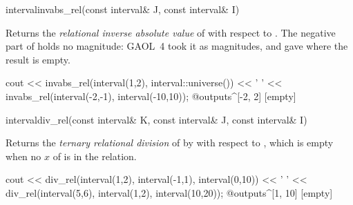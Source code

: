 \documentclass[12pt,a4paper,twoside,openright]{book}
\begin{document}
\begin{deffun}{interval}{invabs\_rel}{(const interval\& J, const interval\& I)}
  \begin{operation}
  \end{operation}
  Returns the \emph{relational inverse absolute value} of  with
  respect to . The negative part of  holds no magnitude:
  GAOL~4 took it as magnitudes, and gave  where the result is
  empty.\newinvfive
\begin{example}
cout << invabs_rel(interval(1,2), interval::universe()) << ' '
     << invabs_rel(interval(-2,-1), interval(-10,10));
@outputs^[-2, 2] [empty]~
\end{example}
\end{deffun}

\begin{deffun}{interval}{div\_rel}{(const interval\& K, const interval\& J, const interval\& I)}
  \begin{operation}
  \end{operation}
  Returns the \emph{ternary relational division} of  by  with
  respect to , which is empty when no $x$ of  is in the
  relation.\newinvfive
\begin{example}
cout << div_rel(interval(1,2), interval(-1,1),
                interval(0,10)) << ' '
     << div_rel(interval(5,6), interval(1,2),
                interval(10,20));
@outputs^[1, 10] [empty]~
\end{example}
\end{deffun}
\end{document}
